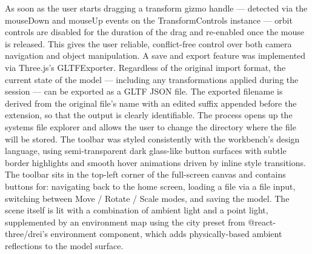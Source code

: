 \documentclass[a4paper,12pt]{article}
\begin{document}
\newpage
As soon as the user starts dragging a transform gizmo handle — detected via the mouseDown and mouseUp events on the TransformControls instance — orbit controls are disabled for the duration of the drag and re-enabled once the mouse is released. This gives the user reliable, conflict-free control over both camera navigation and object manipulation.
A save and export feature was implemented via Three.js's GLTFExporter. Regardless of the original import format, the current state of the model — including any transformations applied during the session — can be exported as a GLTF JSON file. The exported filename is derived from the original file's name with an edited suffix appended before the extension, so that the output is clearly identifiable. The process opens up the systems file explorer and allows the user to change the directory where the file will be stored. 
The toolbar was styled consistently with the workbench's design language, using semi-transparent dark glass-like button surfaces with subtle border highlights and smooth hover animations driven by inline style transitions. The toolbar sits in the top-left corner of the full-screen canvas and contains buttons for: navigating back to the home screen, loading a file via a file input, switching between Move / Rotate / Scale modes, and saving the model. The scene itself is lit with a combination of ambient light and a point light, supplemented by an environment map using the city preset from @react-three/drei's environment component, which adds physically-based ambient reflections to the model surface.
\end{document}
